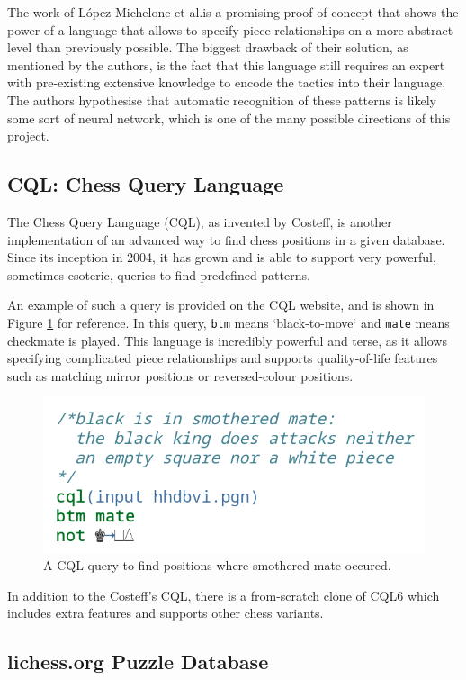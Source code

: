 The work of L\'{o}pez-Michelone et al.\@ is a promising proof of concept that
shows the power of a language that allows to specify piece relationships on a
more abstract level than previously possible. The biggest drawback of their
solution, as mentioned by the authors, is the fact that this language still
requires an expert with pre-existing extensive knowledge to encode the tactics
into their language. The authors hypothesise that automatic recognition of
these patterns is likely some sort of neural network, which is one of the many
possible directions of this project.

\subsection{CQL: Chess Query Language}

The Chess Query Language (CQL), as invented by Costeff,\cite{cql} is another
implementation of an advanced way to find chess positions in a given database.
Since its inception in 2004, it has grown and is able to support very powerful,
sometimes esoteric, queries to find predefined patterns.

An example of such a query is provided on the CQL website,\cite{cqlSmothered}
and is shown in Figure \ref{cql} for reference. In this query, \texttt{btm}
means `black-to-move` and \texttt{mate} means checkmate is played. This
language is incredibly powerful and terse, as it allows specifying complicated
piece relationships and supports quality-of-life features such as matching
mirror positions or reversed-colour positions.

\begin{figure}[H]
    \centering
    \includegraphics[width=0.45\linewidth]{background/img/cql.png}
    \caption{A CQL query to find positions where smothered mate occured.}
    \label{cql}
\end{figure}

In addition to the Costeff's CQL, there is a from-scratch clone of CQL6
which includes extra features and supports other chess
variants.\cite{cqli}

\subsection{lichess.org Puzzle Database}

